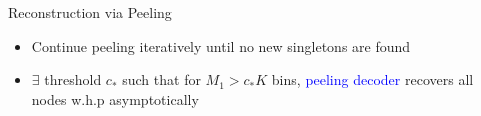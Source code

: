 \documentclass[final]{beamer}
\newlength{\twocolwid}
\newlength{\paraskip}
\begin{document}
\begin{frame}
\begin{columns}[t]
\begin{column}{\twocolwid}
\begin{block}{\Large Reconstruction via Peeling}
       \begin{figure}
	       \centering
	       \begin{subfigure}{.5\textwidth}
			  \centering
   			\scalebox{1.1}{}
		   \end{subfigure}%
		  \begin{subfigure}{.5	\textwidth}
		  \centering
		  \scalebox{1.1}{}
			\end{subfigure}	
		\end{figure}
\vspace{\paraskip}	 
	 \begin{itemize}
	   \item Continue peeling iteratively until no new singletons are found
	   \item $\exists$ threshold $c_*$ such that for $M_1>c_*K$ bins, \textcolor{blue}{peeling decoder} recovers all nodes w.h.p asymptotically
    \end{itemize}
    \end{block}  
 \end{column}


\end{columns}
\end{frame}
\end{document}
